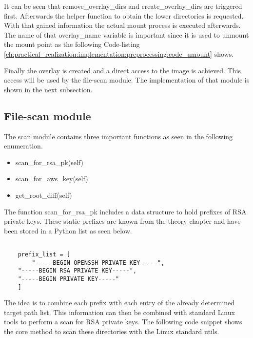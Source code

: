 
It can be seen that remove\_overlay\_dirs and create\_overlay\_dirs are triggered first. 
Afterwards the helper function to obtain the lower directories is requested.
With that gained information the actual mount process is executed afterwards. 
The name of that overlay\_name variable is important since it is used to unmount the mount point as the following Code-listing \ref{ch:practical_realization:implementation:preprocessing:code_umount} shows.


Finally the overlay is created and a direct access to the image is achieved. 
This access will be used by the file-scan module. The implementation of that module is shown in the next subsection.

\subsection{File-scan module}
\label{ch:practical_realization:implementation:scan}
The scan module contains three important functions as seen in the following enumeration.
\begin{itemize}
\item scan\_for\_rsa\_pk(self)
\item scan\_for\_aws\_key(self)
\item get\_root\_diff(self)
\end{itemize}
The function scan\_for\_rsa\_pk includes a data structure to hold prefixes of RSA private keys.
These static prefixes are known from the theory chapter and have been stored in a Python list as seen below.
\lstset{language=Python}          
\begin{lstlisting}[]  % Start your code-block
	
    prefix_list = [
    	"-----BEGIN OPENSSH PRIVATE KEY-----",
	"-----BEGIN RSA PRIVATE KEY-----",
	"-----BEGIN PRIVATE KEY-----"
	]
\end{lstlisting}
The idea is to combine each prefix with each entry of the already determined target path list.
This information can then be combined with standard Linux tools to perform a scan for RSA private keys.
The following code snippet shows the core method to scan these directories with the Linux standard utils.

